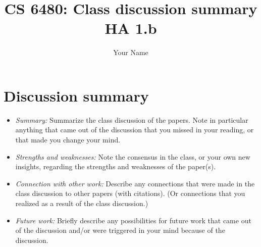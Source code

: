 \documentclass[letterpaper,twocolumn,10pt]{article}
\title{CS 6480: Class discussion summary\\
HA 1.b\\}
\author{Your Name}
\affil{School of Computing, University of Utah}
\begin{document}
\maketitle
\section*{Discussion summary}

\begin{itemize}

\item {\it Summary:} Summarize the class discussion of the papers. Note in
particular anything that came out of the discussion that you missed in your
reading, or that made you change your mind. 

\item {\it Strengths and weaknesses:} Note the consensus
in the class, or your own new insights, regarding the strengths and
weaknesses of the paper(s).

\item {\it Connection with other work:} Describe any connections that were made in
the class discussion to other papers (with citations). (Or connections that you realized
as a result of the class discussion.)

\item {\it Future work:} Briefly describe any possibilities
for future work that came out of the discussion and/or were triggered
in your mind because of the discussion.

\end{itemize}
{
  \small 
  
  
}
\end{document}
